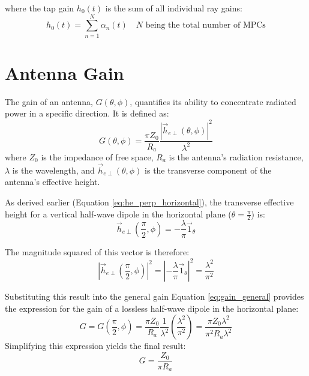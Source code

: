 where the tap gain $h_0(t)$ is the sum of all individual ray gains:
\begin{equation}
	\label{eq:narrow}
	\boxed{h_0(t) = \sum_{n=1}^{N} \alpha_n(t)} \quad N \text{ being the total number of MPCs}
\end{equation}


\section{Antenna Gain}
The gain of an antenna, $G(\theta, \phi)$, quantifies its ability to concentrate radiated power in a specific direction. It is defined as:
\begin{equation}
	G(\theta,\phi) = \frac{\pi Z_0}{R_a} \frac{|\vec{h}_{e\perp}(\theta,\phi)|^2}{\lambda^2}
	\label{eq:gain_general}
\end{equation}
where $Z_0$ is the impedance of free space, $R_a$ is the antenna's radiation resistance, $\lambda$ is the wavelength, and $\vec{h}_{e\perp}(\theta,\phi)$ is the transverse component of the antenna's effective height.

As derived earlier (Equation \ref{eq:he_perp_horizontal}), the transverse effective height for a vertical half-wave dipole in the horizontal plane ($\theta = \frac{\pi}{2}$) is:
\begin{equation}
	\vec{h}_{e\perp}\left(\frac{\pi}{2},\phi\right) = -\frac{\lambda}{\pi}\vec{1}_{\theta}
\end{equation}

The magnitude squared of this vector is therefore:
\begin{equation}
	\left|\vec{h}_{e\perp}\left(\frac{\pi}{2},\phi\right)\right|^2 = \left|-\frac{\lambda}{\pi}\vec{1}_{\theta}\right|^2 = \frac{\lambda^2}{\pi^2}
\end{equation}

Substituting this result into the general gain Equation \eqref{eq:gain_general} provides the expression for the gain of a lossless half-wave dipole in the horizontal plane:
\begin{equation}
	G = G\left(\frac{\pi}{2}, \phi\right) = \frac{\pi Z_0}{R_a} \frac{1}{\lambda^2} \left(\frac{\lambda^2}{\pi^2}\right) = \frac{\pi Z_0 \lambda^2}{\pi^2 R_a \lambda^2}
\end{equation}
Simplifying this expression yields the final result:
\begin{equation}
	G = \frac{Z_0}{\pi R_a}
	\label{eq:gain_derived}
\end{equation}

